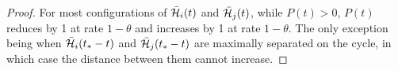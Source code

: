 \begin{proof}
		
		For most configurations of $\bar{\mathcal{H}}_i(t)$ and $\bar{\mathcal{H}}_j(t)$, while $P(t) > 0$, $P(t)$ reduces by 1 at rate $1 - \theta$ and increases by 1 at rate $1 - \theta$. The only exception being when $\bar{\mathcal{H}}_i(t_* - t)$ and $\bar{\mathcal{H}}_j(t_* - t)$ are maximally separated on the cycle, in which case the distance between them cannot increase. 



\end{proof}
